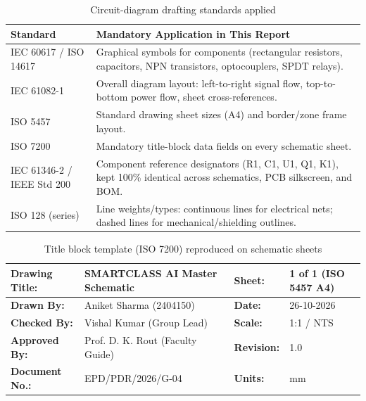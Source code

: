 \documentclass[11pt,a4paper]{article}
\begin{document}
\begin{table}[h!]
\centering
\caption{Circuit-diagram drafting standards applied}
\begin{tabular}{|p{4.5cm}|p{10.5cm}|}
\hline
\textbf{Standard} & \textbf{Mandatory Application in This Report} \\ \hline
IEC 60617 / ISO 14617 & Graphical symbols for components (rectangular resistors, capacitors, NPN transistors, optocouplers, SPDT relays). \\ \hline
IEC 61082-1 & Overall diagram layout: left-to-right signal flow, top-to-bottom power flow, sheet cross-references. \\ \hline
ISO 5457 & Standard drawing sheet sizes (A4) and border/zone frame layout. \\ \hline
ISO 7200 & Mandatory title-block data fields on every schematic sheet. \\ \hline
IEC 61346-2 / IEEE Std 200 & Component reference designators (R1, C1, U1, Q1, K1), kept 100\% identical across schematics, PCB silkscreen, and BOM. \\ \hline
ISO 128 (series) & Line weights/types: continuous lines for electrical nets; dashed lines for mechanical/shielding outlines. \\ \hline
\end{tabular}
\end{table}

\begin{table}[h!]
\centering
\begin{tabular}{|l|p{4.5cm}|l|p{3.5cm}|}
\hline
\textbf{Drawing Title:} & SMARTCLASS AI Master Schematic & \textbf{Sheet:} & 1 of 1 (ISO 5457 A4) \\ \hline
\textbf{Drawn By:} & Aniket Sharma (2404150) & \textbf{Date:} & 26-10-2026 \\ \hline
\textbf{Checked By:} & Vishal Kumar (Group Lead) & \textbf{Scale:} & 1:1 / NTS \\ \hline
\textbf{Approved By:} & Prof. D. K. Rout (Faculty Guide) & \textbf{Revision:} & 1.0 \\ \hline
\textbf{Document No.:} & EPD/PDR/2026/G-04 & \textbf{Units:} & mm \\ \hline
\end{tabular}
\caption{Title block template (ISO 7200) reproduced on schematic sheets}
\end{table}

\newpage
\end{document}
